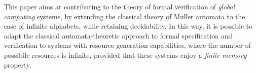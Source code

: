 


This paper aims at contributing to the theory of formal verification of \emph{global computing} systems, by extending the classical theory of Muller automata to the case of infinite alphabets, while retaining decidability. In this way, it is possible to adapt the classical automata-theoretic approach to formal specification and verification \cite{ClarkeS01} to systems with resource generation capabilities, where the number of possibile resources is infinite, provided that these systems enjoy a \emph{finite memory} property. 

